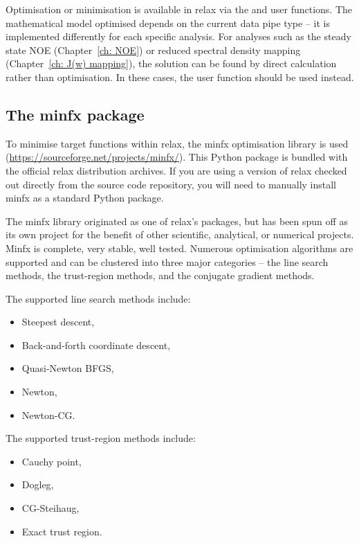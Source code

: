 Optimisation or minimisation is available in relax via the  and  user functions.
The mathematical model optimised depends on the current data pipe type -- it is implemented differently for each specific analysis.
For analyses such as the steady state NOE (Chapter~\ref{ch: NOE}) or reduced spectral density mapping (Chapter~\ref{ch: J(w) mapping}), the solution can be found by direct calculation rather than optimisation.
In these cases, the  user function should be used instead.




\subsection{The minfx package}

To minimise target functions within relax, the minfx optimisation library is used (\href{https://sourceforge.net/projects/minfx/}{https://sourceforge.net/projects/minfx/}).
This Python package is bundled with the official relax distribution archives.
If you are using a version of relax checked out directly from the source code repository, you will need to manually install minfx as a standard Python package.

The minfx library originated as one of relax's packages, but has been spun off as its own project for the benefit of other scientific, analytical, or numerical projects.
Minfx is complete, very stable, well tested.
Numerous optimisation algorithms are supported and can be clustered into three major categories -- the line search methods, the trust-region methods, and the conjugate gradient methods.

The supported line search methods include:
\begin{itemize}
  \item Steepest descent,
  \item Back-and-forth coordinate descent,
  \item Quasi-Newton BFGS,
  \item Newton,
  \item Newton-CG.
\end{itemize}

The supported trust-region methods include:
\begin{itemize}
  \item Cauchy point,
  \item Dogleg,
  \item CG-Steihaug,
  \item Exact trust region.
\end{itemize}

